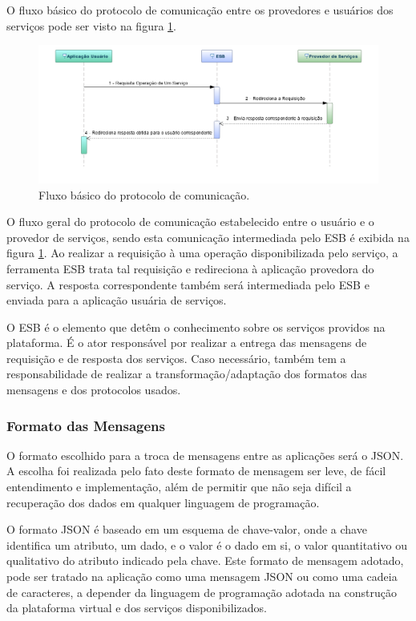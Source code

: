 O fluxo básico do protocolo de comunicação entre os provedores e usuários dos serviços pode ser visto na figura \ref{fluxo_basico_protocolo}.

\begin{figure}[htb]
\centering
\includegraphics[width=1\textwidth]{figuras/fluxo_basico_protocolo.png}
\caption{Fluxo básico do protocolo de comunicação.}
\label{fluxo_basico_protocolo}
\end{figure}

O fluxo geral do protocolo de comunicação estabelecido entre o usuário e o provedor de serviços, sendo esta comunicação intermediada pelo ESB é exibida na figura \ref{fluxo_basico_protocolo}. Ao realizar a requisição à uma operação disponibilizada pelo serviço, a ferramenta ESB trata tal requisição e redireciona à aplicação provedora do serviço. A resposta correspondente também será intermediada pelo ESB e enviada para a aplicação usuária de serviços.

O ESB é o elemento que detêm o conhecimento sobre os serviços providos na plataforma. É o ator responsável por realizar a entrega das mensagens de requisição e de resposta dos serviços. Caso necessário, também tem a  responsabilidade de realizar a transformação/adaptação dos formatos das mensagens e dos protocolos usados.

\subsubsection{Formato das Mensagens}
O formato escolhido para a troca de mensagens entre as aplicações será o JSON. A escolha foi realizada pelo fato deste formato de mensagem ser leve, de fácil entendimento e implementação, além de permitir que não seja difícil a recuperação dos dados em qualquer linguagem de programação.

O formato JSON é baseado em um esquema de chave-valor, onde a chave identifica um atributo, um dado, e o valor é o dado em si, o valor quantitativo ou qualitativo do atributo indicado pela chave. Este formato de mensagem adotado, pode ser tratado na aplicação como uma mensagem JSON ou como uma cadeia de caracteres, a depender da linguagem de programação adotada na construção da plataforma virtual e dos serviços disponibilizados.

